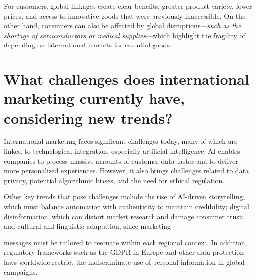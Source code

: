 \documentclass[letterpaper, 12pt]{article}
\begin{document}
For customers, global linkages create clear benefits: greater product variety,
lower prices, and access to innovative goods that were previously inaccessible.
On the other hand, consumers can also be affected by global
disruptions—\textit{such as the shortage of semiconductors or medical
    supplies}—which highlight the fragility of depending on international markets
for essential goods.

\section{What challenges does international marketing currently have, considering new trends?}

International marketing faces significant challenges today, many of which are
linked to technological integration, especially artificial intelligence. AI
enables companies to process massive amounts of customer data faster and to
deliver more personalized experiences. However, it also brings challenges
related to data privacy, potential algorithmic biases, and the need for ethical
regulation.

Other key trends that pose challenges include the rise of AI-driven
storytelling, which must balance automation with authenticity to maintain
credibility; digital disinformation, which can distort market research and
damage consumer trust; and cultural and linguistic adaptation, since marketing

messages must be tailored to resonate within each regional context. In
addition, regulatory frameworks such as the GDPR in Europe and other
data-protection laws worldwide restrict the indiscriminate use of personal
information in global campaigns.

\newpage

\printbibliography
\end{document}
